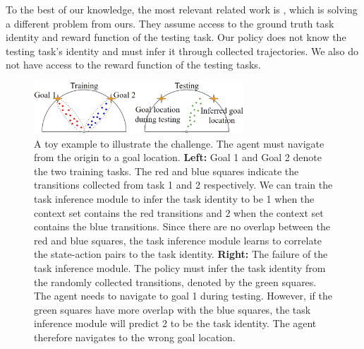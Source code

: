 To the best of our knowledge, the most relevant related work is \cite{siegel2020keep}, which is solving a different problem from ours.
They assume access to the ground truth task identity and reward function of the testing task.
Our policy does not know the testing task's identity and must infer it through collected trajectories.
We also do not have access to the reward function of the testing tasks.

\begin{figure}[t]
    \centering
    \includegraphics[width=0.7\textwidth]{chapter_2/fig/mismatch.png}
    \caption{A toy example to illustrate the challenge. The agent must navigate from the origin to a goal location. \textbf{Left:} Goal 1 and Goal 2 denote the two training tasks. The red and blue squares indicate the transitions collected from task 1 and 2 respectively. We can train the task inference module to infer the task identity to be 1 when the context set contains the red transitions and 2 when the context set contains the blue transitions. Since there are no overlap between the red and blue squares, the task inference module learns to correlate the state-action pairs to the task identity. \textbf{Right:} The failure of the task inference module. The policy must infer the task identity from the randomly collected transitions, denoted by the green squares.
        The agent needs to navigate to goal 1 during testing. However, if the green squares have more overlap with the blue squares, the task inference module will predict 2 to be the task identity. The agent therefore navigates to the wrong goal location.}
    \label{fig:cheat}
\end{figure}
